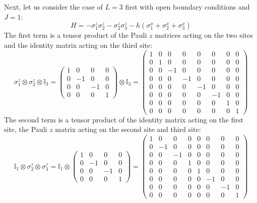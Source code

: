 \documentclass[12pt]{article}
\begin{document}
Next, let us consider the case of $L=3$ first with open boundary conditions and $J=1$:
\begin{equation}
    H = -\sigma_{1}^{z} \sigma_{2}^{z} - \sigma_{2}^{z} \sigma_{3}^{z} - h(\sigma_{1}^{x} + \sigma_{2}^{x} + \sigma_{3}^{x})
\end{equation}
The first term is a tensor product of the Pauli $z$ matrices acting on the two sites and the identity matrix acting on the third site:
\begin{equation}
    \sigma_{1}^{z} \otimes \sigma_{2}^{z} \otimes \mathbb{I}_{3} = \begin{pmatrix} 1 & 0 & 0 & 0 \\ 0 & -1 & 0 & 0 \\ 0 & 0 & -1 & 0 \\ 0 & 0 & 0 & 1 \end{pmatrix} \otimes \mathbb{I}_{3} = \begin{pmatrix} 1 & 0 & 0 & 0 & 0 & 0 & 0 & 0 \\ 0 & 1 & 0 & 0 & 0 & 0 & 0 & 0 \\ 0 & 0 & -1 & 0 & 0 & 0 & 0 & 0 \\ 0 & 0 & 0 & -1 & 0 & 0 & 0 & 0 \\ 0 & 0 & 0 & 0 & -1 & 0 & 0 & 0 \\ 0 & 0 & 0 & 0 & 0 & -1 & 0 & 0 \\ 0 & 0 & 0 & 0 & 0 & 0 & 1 & 0 \\ 0 & 0 & 0 & 0 & 0 & 0 & 0 & 1 \end{pmatrix}
\end{equation}
The second term is a tensor product of the identity matrix acting on the first site, the Pauli $z$ matrix acting on the second site and third site:
\begin{equation}
    \mathbb{I}_{1} \otimes \sigma_{2}^{z} \otimes \sigma_{3}^{z} = \mathbb{I}_{1} \otimes \begin{pmatrix} 1 & 0 & 0 & 0 \\ 0 & -1 & 0 & 0 \\ 0 & 0 & -1 & 0 \\ 0 & 0 & 0 & 1 \end{pmatrix} = \begin{pmatrix} 1 & 0 & 0 & 0 & 0 & 0 & 0 & 0 \\ 0 & -1 & 0 & 0 & 0 & 0 & 0 & 0 \\ 0 & 0 & -1 & 0 & 0 & 0 & 0 & 0 \\ 0 & 0 & 0 & 1 & 0 & 0 & 0 & 0 \\ 0 & 0 & 0 & 0 & 1 & 0 & 0 & 0 \\ 0 & 0 & 0 & 0 & 0 & -1 & 0 & 0 \\ 0 & 0 & 0 & 0 & 0 & 0 & -1 & 0 \\ 0 & 0 & 0 & 0 & 0 & 0 & 0 & 1 \end{pmatrix}
\end{equation}
\end{document}
